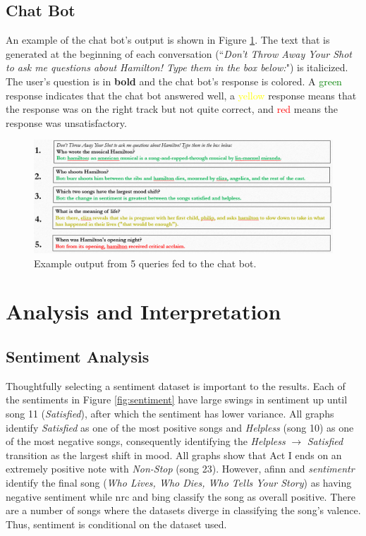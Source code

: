\documentclass{article}
\begin{document}
\subsection{Chat Bot}

An example of the chat bot's output is shown in Figure \ref{fig:chat_bot}. The text that is generated at the beginning of each conversation (``\emph{Don't Throw Away Your Shot to ask me questions about Hamilton! Type them in the box below:}") is italicized. The user's question is in \textbf{bold} and the chat bot's response is colored. A \textcolor{green}{green} response indicates that the chat bot answered well, a \textcolor{yellow}{yellow} response means that the response was on the right track but not quite correct, and \textcolor{red}{red} means the response was unsatisfactory. 

\begin{figure}[h]
    \caption{Example output from 5 queries fed to the chat bot. \label{fig:chat_bot}}
    \centering
    \includegraphics[width=0.7\paperwidth]{chat_bot_output.png}
\end{figure}


\section{Analysis and Interpretation}

\subsection{Sentiment Analysis}

Thoughtfully selecting a sentiment dataset is important to the results. Each of the sentiments in Figure \ref{fig:sentiment} have large swings in sentiment up until song 11 (\emph{Satisfied}), after which the sentiment has lower variance. All graphs identify \emph{Satisfied} as one of the most positive songs and \emph{Helpless} (song 10) as one of the most negative songs, consequently identifying the \emph{Helpless} $\rightarrow$ \emph{Satisfied} transition as the largest shift in mood. All graphs show that Act I ends on an extremely positive note with \emph{Non-Stop} (song 23). However, afinn and \emph{sentimentr} identify the final song (\emph{Who Lives, Who Dies, Who Tells Your Story}) as having negative sentiment while nrc and bing classify the song as overall positive. There are a number of songs where the datasets diverge in classifying the song's valence. Thus, sentiment is conditional on the dataset used.
\end{document}
